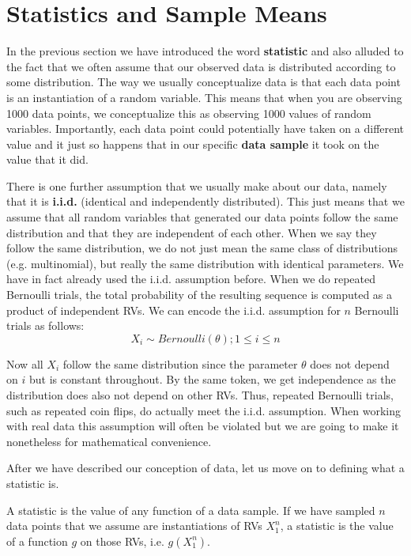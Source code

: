 \section{Statistics and Sample Means}

In the previous section we have introduced the word \textbf{statistic} and also alluded to the fact that we often assume that our
observed data is distributed according to some distribution. The way we usually conceptualize data is that each data point is
an instantiation of a random variable. This means that when you are observing 1000 data points, we conceptualize this as observing
1000 values of random variables. Importantly, each data point could potentially have taken on a different value and it just 
so happens that in our specific \textbf{data sample} it took on the value that it did.

There is one further assumption that we usually make about our data, namely that it is \textbf{i.i.d.} (identical and independently
distributed). This just means that we assume that all random variables that generated our data points follow the same distribution and 
that they are independent of each other. When we say they follow the same distribution, we do not just mean the same class of
distributions (e.g. multinomial), but really the same distribution with identical parameters. We have in fact already used the i.i.d.
assumption before. When we do repeated Bernoulli trials, the total probability of the resulting sequence is computed as a product
of independent RVs. We can encode the i.i.d. assumption for $ n $ Bernoulli trials as follows:
\begin{equation}
X_{i} \sim Bernoulli(\theta); 1 \leq i \leq n
\end{equation}

Now all $ X_{i} $ follow the same distribution since the parameter $ \theta $ does not depend on $ i $ but is constant throughout.
By the same token, we get independence as the distribution does also not depend on other RVs. Thus, repeated Bernoulli trials,
such as repeated coin flips, do actually meet the i.i.d. assumption. When working with real data this assumption will often be
violated but we are going to make it nonetheless for mathematical convenience.

After we have described our conception of data, let us move on to defining what a statistic is.

\begin{Definition}
A statistic is the value of any function of a data sample. If we have sampled $ n $ data points that we assume are instantiations of RVs
$ X_{1}^{n} $, a statistic is the value of a function $ g $ on those RVs, i.e. $ g(X_{1}^{n}) $.
\end{Definition}

